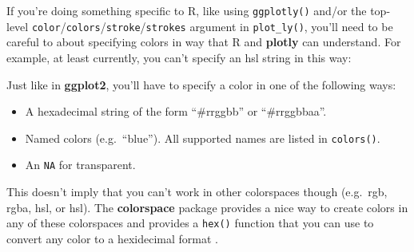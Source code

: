 \documentclass[
  12pt,
]{krantz}
\newenvironment{Shaded}{\begin{snugshade}}{\end{snugshade}}
\newcommand{\CommentTok}[1]{\textcolor[rgb]{0.56,0.35,0.01}{\textit{#1}}}
\newcommand{\DataTypeTok}[1]{\textcolor[rgb]{0.13,0.29,0.53}{#1}}
\newcommand{\DecValTok}[1]{\textcolor[rgb]{0.00,0.00,0.81}{#1}}
\newcommand{\FloatTok}[1]{\textcolor[rgb]{0.00,0.00,0.81}{#1}}
\newcommand{\KeywordTok}[1]{\textcolor[rgb]{0.13,0.29,0.53}{\textbf{#1}}}
\newcommand{\NormalTok}[1]{#1}
\newcommand{\OperatorTok}[1]{\textcolor[rgb]{0.81,0.36,0.00}{\textbf{#1}}}
\newcommand{\StringTok}[1]{\textcolor[rgb]{0.31,0.60,0.02}{#1}}
\providecommand{\tightlist}{%
  \setlength{\itemsep}{0pt}\setlength{\parskip}{0pt}}
\begin{document}
If you're doing something specific to R, like using \texttt{ggplotly()} and/or the top-level \texttt{color}/\texttt{colors}/\texttt{stroke}/\texttt{strokes} argument in \texttt{plot\_ly()}, you'll need to be careful to about specifying colors in way that R and \textbf{plotly} can understand. For example, at least currently, you can't specify an hsl string in this way:

\begin{Shaded}
\end{Shaded}

\begin{Shaded}
\end{Shaded}

Just like in \textbf{ggplot2}, you'll have to specify a color in one of the following ways:

\begin{itemize}
\tightlist
\item
  A hexadecimal string of the form ``\#rrggbb'' or ``\#rrggbbaa''.
\item
  Named colors (e.g.~``blue''). All supported names are listed in \texttt{colors()}.
\item
  An \texttt{NA} for transparent.
\end{itemize}

This doesn't imply that you can't work in other colorspaces though (e.g.~rgb, rgba, hsl, or hsl). The \textbf{colorspace} package provides a nice way to create colors in any of these colorspaces and provides a \texttt{hex()} function that you can use to convert any color to a hexidecimal format \citep{colorspace}.

\begin{Shaded}
\end{Shaded}
\end{document}
